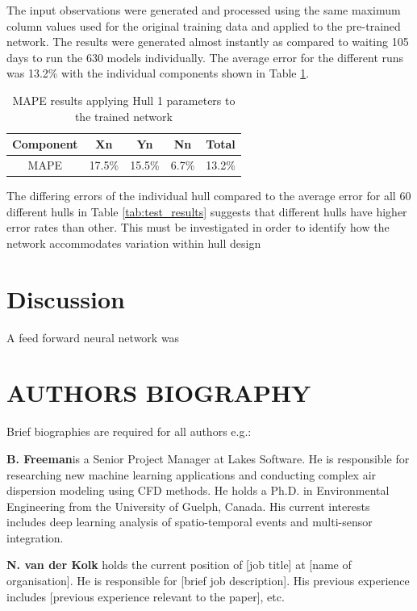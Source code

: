 \documentclass[twoside,twocolumn]{article}
\begin{document}
The input observations were generated and processed using the same maximum column values used for the original training data and applied to the pre-trained network. The results were generated almost instantly as compared to waiting 105 days to run the 630 models individually. The average error for the different runs was 13.2\% with the individual components shown in Table \ref{tab:hull1_results}.

\begin{table}[]
\centering
\caption{MAPE results applying Hull 1 parameters to the trained network}
\label{tab:hull1_results}
\begin{tabular}{@{}ccccc@{}}
\toprule
\textbf{Component} & \textbf{Xn} & \textbf{Yn} & \textbf{Nn} & \textbf{Total} \\ \midrule
MAPE & 17.5\% & 15.5\% & 6.7\% & 13.2\% \\ \bottomrule
\end{tabular}
\end{table}

The differing errors of the individual hull compared to the average error for all 60 different hulls in Table \ref{tab:test_results} suggests that different hulls have higher error rates than other. This must be investigated in order to identify how the network accommodates variation within hull design



\section{Discussion}

A feed forward neural network was 



{}


\section{AUTHORS BIOGRAPHY}

Brief biographies are required for all authors e.g.:

\textbf{B. Freeman}is a Senior Project Manager at Lakes Software.  He is responsible for researching new machine learning applications and conducting complex air dispersion modeling using CFD methods.  He holds a Ph.D. in Environmental Engineering from the University of Guelph, Canada. His current interests includes deep learning analysis of spatio-temporal events and multi-sensor integration.

\textbf{N. van der Kolk} holds the current position of [job title] at [name of organisation].  He is responsible for [brief job description].  His previous experience includes [previous experience relevant to the paper], etc.

\end{document}
